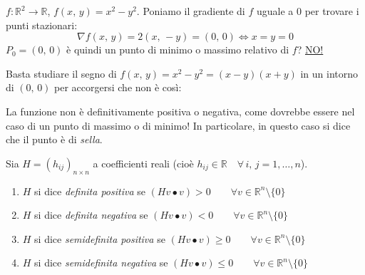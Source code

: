 \begin{example}
$f : \mathbb{R}^2 \longrightarrow \mathbb{R}$, $f(x,\,y) = x^2-y^2$.
Poniamo il gradiente di $f$ uguale a $0$ per trovare i punti stazionari:
$$
\nabla f(x,\,y) = 2(x,\,-y) = (0,\,0) \Longleftrightarrow x=y=0
$$
$P_0 = (0,\,0)$ è quindi un punto di minimo o massimo relativo di $f$? \underline{NO!}

Basta studiare il segno di $f(x,\,y) = x^2-y^2 = (x-y)(x+y)$ in un intorno di $(0,\,0)$ per accorgersi che non è così:
\begin{center}
\def\svgwidth{8cm}

\end{center}
La funzione non è definitivamente positiva o negativa, come dovrebbe essere nel caso di un punto di massimo o di minimo! In particolare, in questo caso si dice che il punto è di \emph{sella}.
\end{example}

\begin{definition}
Sia $H = (h_{ij})_{n \times n}$ a coefficienti reali (cioè $h_{ij} \in \mathbb{R} \quad \forall \, i,\,j = 1,\ldots,n$).
\begin{enumerate}[labelindent=\parindent,leftmargin=*,label=\textnormal{(\roman*)},start=1]
\item $H$ si dice \emph{definita positiva} se 
$\left( Hv \bullet v \right) > 0 \qquad \forall v \in \mathbb{R}^n \setminus \lbrace 0 \rbrace$
\item $H$ si dice \emph{definita negativa} se 
$\left( Hv \bullet v \right) < 0 \qquad \forall v \in \mathbb{R}^n \setminus \lbrace 0 \rbrace$
\item $H$ si dice \emph{semidefinita positiva} se 
$\left( Hv \bullet v \right) \geq 0 \qquad \forall v \in \mathbb{R}^n \setminus \lbrace 0 \rbrace$
\item $H$ si dice \emph{semidefinita negativa} se 
$\left( Hv \bullet v \right) \leq 0 \qquad \forall v \in \mathbb{R}^n \setminus \lbrace 0 \rbrace$
\end{enumerate}
\end{definition}

